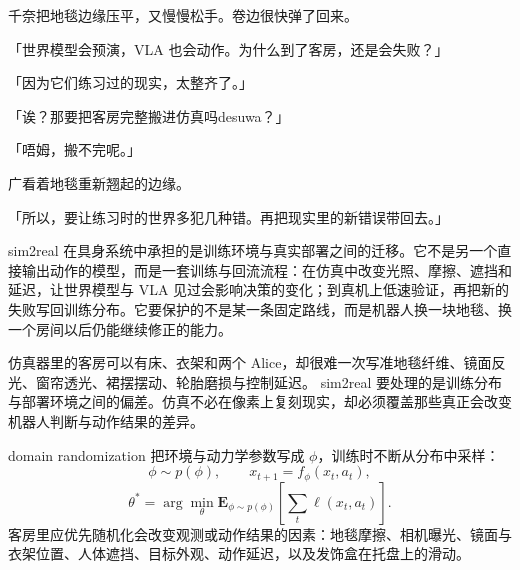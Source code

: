 千奈把地毯边缘压平，又慢慢松手。卷边很快弹了回来。

「世界模型会预演，VLA 也会动作。为什么到了客房，还是会失败？」

「因为它们练习过的现实，太整齐了。」

「诶？那要把客房完整搬进仿真吗desuwa？」

「唔姆，搬不完呢。」

广看着地毯重新翘起的边缘。

「所以，要让练习时的世界多犯几种错。再把现实里的新错误带回去。」

sim2real 在具身系统中承担的是训练环境与真实部署之间的迁移。它不是另一个直接输出动作的模型，而是一套训练与回流流程：在仿真中改变光照、摩擦、遮挡和延迟，让世界模型与 VLA 见过会影响决策的变化；到真机上低速验证，再把新的失败写回训练分布。它要保护的不是某一条固定路线，而是机器人换一块地毯、换一个房间以后仍能继续修正的能力。

仿真器里的客房可以有床、衣架和两个 Alice，却很难一次写准地毯纤维、镜面反光、窗帘透光、裙摆摆动、轮胎磨损与控制延迟。
sim2real 要处理的是训练分布与部署环境之间的偏差。仿真不必在像素上复刻现实，却必须覆盖那些真正会改变机器人判断与动作结果的差异。

domain randomization 把环境与动力学参数写成 $\phi$，训练时不断从分布中采样\cite{tobin2017domain,peng2018dynamics}：
\begin{equation}
\phi\sim p(\phi),\qquad
x_{t+1}=f_\phi(x_t,a_t),
\end{equation}
\begin{equation}
\theta^\ast=
\arg\min_\theta
\mathbf E_{\phi\sim p(\phi)}
\left[\sum_t \ell(x_t,a_t)\right].
\end{equation}
客房里应优先随机化会改变观测或动作结果的因素：地毯摩擦、相机曝光、镜面与衣架位置、人体遮挡、目标外观、动作延迟，以及发饰盒在托盘上的滑动。

